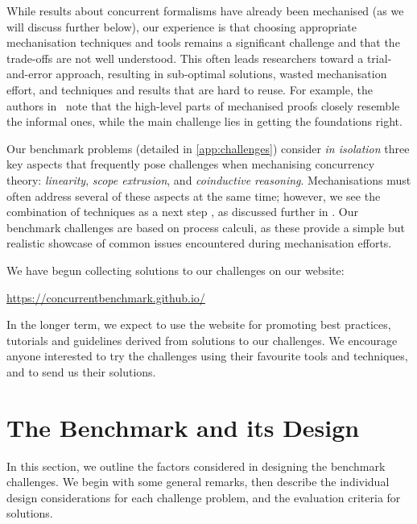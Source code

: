 \documentclass[runningheads]{llncs}
\begin{document}
While results about concurrent
formalisms have already been mechanised (as we will discuss further
below), our experience is that choosing appropriate mechanisation
techniques and tools remains a significant challenge and that the
trade-offs are not well understood.  This often leads researchers
toward a trial-and-error approach, resulting in sub-optimal solutions,
wasted mechanisation effort, and techniques and results that are hard
to reuse. For example, the authors in~\cite{Cruz-Filipe2021b} note that the high-level parts of
mechanised proofs closely resemble the informal ones, while the
main challenge lies in getting the foundations right.

Our benchmark problems (detailed in \cref{app:challenges}) consider
\emph{in isolation} three key aspects that frequently pose challenges
when mechanising concurrency theory: \emph{linearity}, \emph{scope
  extrusion}, and \emph{coinductive reasoning}.  Mechanisations must
often address several of these aspects at the same time; however, we
see the combination of techniques as a next
step%
, as discussed further in .  Our benchmark
challenges are based on process calculi, as these provide a simple but
realistic showcase of common issues encountered during mechanisation
efforts.

We have begun collecting solutions to our challenges on our website:
%
\begin{center}
  \url{https://concurrentbenchmark.github.io/}
\end{center}
%
In the longer term, we expect to use the website for promoting best
practices, tutorials and guidelines derived from solutions to our
challenges.  We encourage anyone interested to try the challenges
using their favourite tools and techniques, and to send us their
solutions.

\section{The Benchmark and its Design}\label{sec:design-discussion}
In this section, we outline the factors considered in designing the benchmark challenges.
We begin with some general remarks, then describe the individual design considerations for each challenge problem, and the evaluation criteria for solutions.
\end{document}
